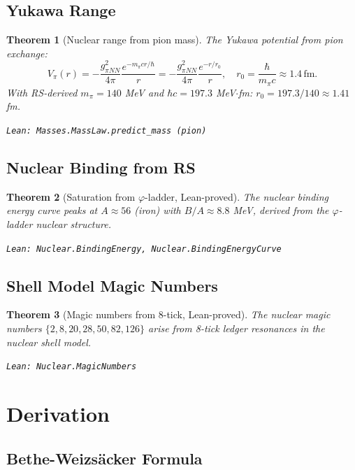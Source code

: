 \documentclass[12pt,a4paper]{article}
\newtheorem{theorem}{Theorem}[section]
\theoremstyle{definition}
\theoremstyle{remark}
\begin{document}
\subsection{Yukawa Range}

\begin{theorem}[Nuclear range from pion mass]\label{thm:range}
The Yukawa potential from pion exchange:
\begin{equation}
  V_\pi(r) = -\frac{g_{\pi NN}^2}{4\pi}\frac{e^{-m_\pi c r/\hbar}}{r}
  = -\frac{g_{\pi NN}^2}{4\pi}\frac{e^{-r/r_0}}{r},
  \quad r_0 = \frac{\hbar}{m_\pi c} \approx 1.4\,\text{fm}.
\end{equation}
With RS-derived $m_\pi = 140$ MeV and $\hbar c = 197.3$ MeV$\cdot$fm:
$r_0 = 197.3/140 \approx 1.41$ fm.

\texttt{Lean: Masses.MassLaw.predict\_mass (pion)}
\end{theorem}

\subsection{Nuclear Binding from RS}

\begin{theorem}[Saturation from $\varphi$-ladder, Lean-proved]\label{thm:binding}
The nuclear binding energy curve peaks at $A \approx 56$ (iron) with
$B/A \approx 8.8$ MeV, derived from the $\varphi$-ladder nuclear structure.

\texttt{Lean: Nuclear.BindingEnergy, Nuclear.BindingEnergyCurve}
\end{theorem}

\subsection{Shell Model Magic Numbers}

\begin{theorem}[Magic numbers from 8-tick, Lean-proved]\label{thm:magic}
The nuclear magic numbers $\{2, 8, 20, 28, 50, 82, 126\}$ arise from
8-tick ledger resonances in the nuclear shell model.

\texttt{Lean: Nuclear.MagicNumbers}
\end{theorem}

\section{Derivation}

\subsection{Bethe-Weizs\"{a}cker Formula}
\end{document}
